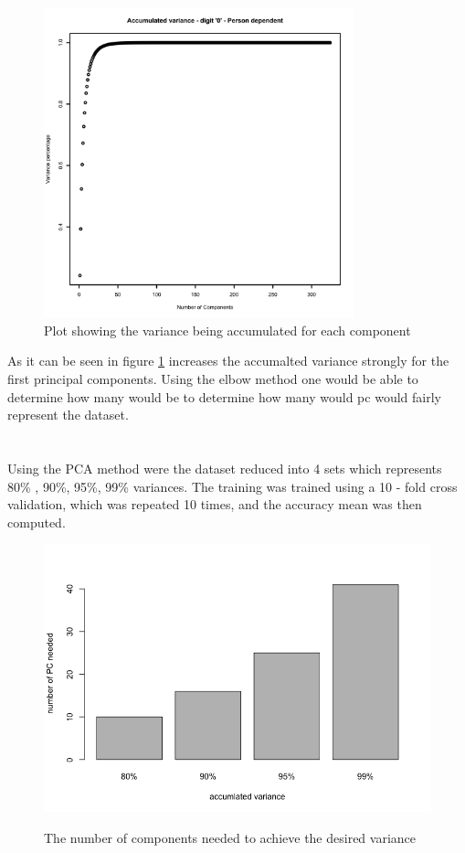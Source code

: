 \begin{figure}[H]
\centering
\includegraphics[width = 0.8\textwidth]{graphics/accumulated-2-1-person-dependent.png}
\caption{Plot showing the variance being accumulated for each component}
\label{fig:PCa_num_comp}
\end{figure}

As it can be seen in figure \ref{fig:PCa_num_comp} increases the accumalted variance strongly for the first principal components.  Using the elbow method one would be able to determine how many would be to determine how many would pc would fairly represent the dataset. 
\\
\\
\\
Using the PCA method were the dataset reduced into 4 sets  which represents 80\% , 90\%, 95\%, 99\% variances. The training was trained using a 10 - fold cross validation, which was repeated 10 times, and the accuracy mean was then computed. 

\begin{figure}[H]
\centering
\includegraphics[width = \textwidth]{graphics/PCA_barplot.png}
\label{fig:pca_comp}
\caption{The number of components needed to achieve the desired variance}
\end{figure}

